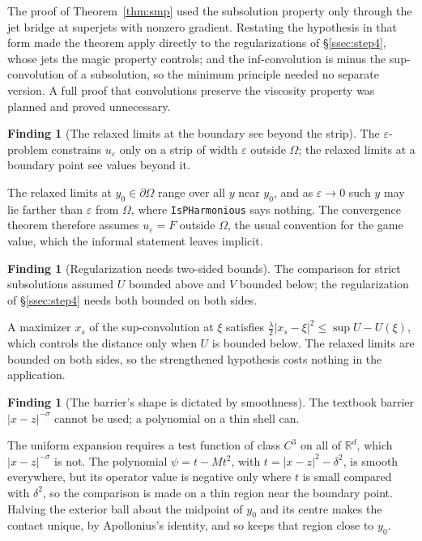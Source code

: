 \documentclass[11pt,reqno]{amsart}
\newcommand{\LEANREF}[1]{\texttt{\small\def\_{\textunderscore\allowbreak}#1}}
\newcommand{\R}{\mathbb{R}}
\newcommand{\eps}{\varepsilon}
\theoremstyle{plain}
\theoremstyle{definition}
\newtheorem{finding}[theorem]{Finding}
\begin{document}
The proof of Theorem~\ref{thm:smp} used the subsolution property only through
the jet bridge at superjets with nonzero gradient. Restating the hypothesis in
that form made the theorem apply directly to the regularizations of
\S\ref{ssec:step4}, whose jets the magic property controls; and the
inf-convolution is minus the sup-convolution of a subsolution, so the minimum
principle needed no separate version. A full proof that convolutions preserve
the viscosity property was planned and proved unnecessary.

\begin{finding}[The relaxed limits at the boundary see beyond the
strip]\label{find:beyondstrip}
The $\eps$-problem constrains $u_\eps$ only on a strip of width $\eps$ outside
$\Omega$; the relaxed limits at a boundary point see values beyond it.
\end{finding}

The relaxed limits at $y_0 \in \partial\Omega$ range over all $y$ near $y_0$,
and as $\eps \to 0$ such $y$ may lie farther than $\eps$ from $\Omega$, where
\LEANREF{IsPHarmonious} says nothing. The convergence theorem therefore assumes
$u_\eps = F$ outside $\Omega$, the usual convention for the game value, which
the informal statement leaves implicit.

\begin{finding}[Regularization needs two-sided bounds]\label{find:twosided}
The comparison for strict subsolutions assumed $U$ bounded above and $V$ bounded
below; the regularization of \S\ref{ssec:step4} needs both bounded on both
sides.
\end{finding}

A maximizer $x_s$ of the sup-convolution at $\xi$ satisfies
$\tfrac\lambda2|x_s - \xi|^2 \le \sup U - U(\xi)$, which controls the distance
only when $U$ is bounded below. The relaxed limits are bounded on both sides, so
the strengthened hypothesis costs nothing in the application.

\begin{finding}[The barrier's shape is dictated by smoothness]\label{find:thinshell}
The textbook barrier $|x - z|^{-\sigma}$ cannot be used; a polynomial on a thin
shell can.
\end{finding}

The uniform expansion requires a test function of class $C^3$ on all of $\R^d$,
which $|x - z|^{-\sigma}$ is not. The polynomial $\psi = t - Mt^2$, with
$t = |x - z|^2 - \delta^2$, is smooth everywhere, but its operator value is
negative only where $t$ is small compared with $\delta^2$, so the comparison is
made on a thin region near the boundary point. Halving the exterior ball about
the midpoint of $y_0$ and its centre makes the contact unique, by Apollonius's
identity, and so keeps that region close to $y_0$.
\end{document}
